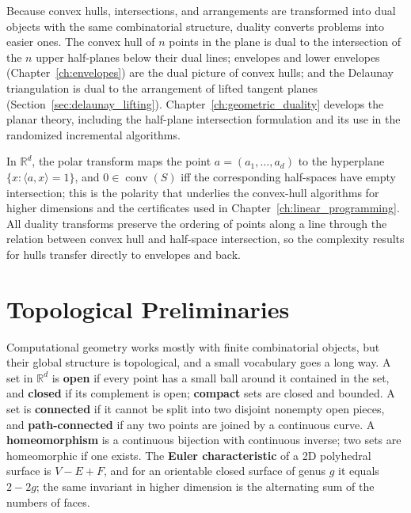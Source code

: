 Because convex hulls, intersections, and arrangements are transformed into
dual objects with the same combinatorial structure, duality converts
problems into easier ones. The convex hull of $n$ points in the plane is
dual to the intersection of the $n$ upper half-planes below their dual
lines; envelopes and lower envelopes
(Chapter~\ref{ch:envelopes}) are the dual picture of convex hulls; and the
Delaunay triangulation is dual to the arrangement of lifted tangent planes
(Section~\ref{sec:delaunay_lifting}). Chapter~\ref{ch:geometric_duality}
develops the planar theory, including the half-plane intersection
formulation and its use in the randomized incremental algorithms.

In $\mathbb{R}^d$, the polar transform maps the point $a = (a_1,\dots,a_d)$
to the hyperplane $\{x : \langle a, x\rangle = 1\}$, and $0 \in
\operatorname{conv}(S)$ iff the corresponding half-spaces have empty
intersection; this is the polarity that underlies the convex-hull
algorithms for higher dimensions and the certificates used in
Chapter~\ref{ch:linear_programming}. All duality transforms preserve the
ordering of points along a line through the relation between convex hull and
half-space intersection, so the complexity results for hulls transfer
directly to envelopes and back.


\section{Topological Preliminaries}
\label{sec:math_topology}

Computational geometry works mostly with finite combinatorial objects, but
their global structure is topological, and a small vocabulary goes a long
way. A set in $\mathbb{R}^d$ is \textbf{open} if every point has a small
ball around it contained in the set, and \textbf{closed} if its complement
is open; \textbf{compact} sets are closed and bounded. A set is
\textbf{connected} if it cannot be split into two disjoint nonempty open
pieces, and \textbf{path-connected} if any two points are joined by a
continuous curve. A \textbf{homeomorphism} is a continuous bijection with
continuous inverse; two sets are homeomorphic if one exists. The
\textbf{Euler characteristic} of a 2D polyhedral surface is
$V - E + F$, and for an orientable closed surface of genus $g$ it equals
$2 - 2g$; the same invariant in higher dimension is the alternating sum of
the numbers of faces.

